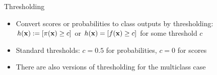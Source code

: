 \documentclass[11pt,compress,t,notes=noshow, xcolor=table]{beamer}
\begin{document}
\begin{frame}{Thresholding}
  
\begin{itemize}
\item Convert scores or probabilities to class outputs by thresholding: \\[0.5ex]
$h(\mathbf{x}):= [\pi(\mathbf{x}) \ge c]$ or $h(\mathbf{x}) = [f(\mathbf{x}) \ge c]$ for some threshold $c$
\item Standard thresholds: $c = 0.5$ for probabilities, $c = 0$ for scores
\item There are also versions of thresholding for the multiclass case

\end{itemize}



\end{frame}
\end{document}
